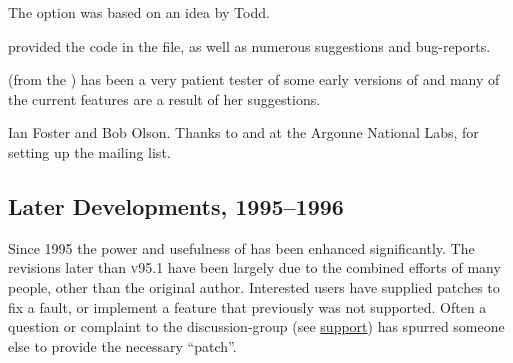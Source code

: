 \begin{htmllist}
\item [\ToddLittle]
The  option was based on an idea by Todd.


\item [\AxelBelinfante]
provided the \Perl{} code in the  file, 
as well as numerous suggestions and bug-reports. 

\item [\VerenaUmar] (from the \CSEP) 
has been a very patient tester of some early versions of \latextohtml{}
and many of the current features are a result of her suggestions. 

%

\item [Ian Foster and Bob Olson.]
Thanks to \IanFoster{} and \BobOlson{} at the Argonne National Labs, 
for setting up the mailing list.
\end{htmllist}


\subsection*{Later Developments, 1995--1996\label{recent96}}%
%
Since 1995 the power and usefulness of \latextohtml{} has been enhanced significantly.
The revisions later than \textsc{v95.1} have been largely due 
to the combined efforts of many people, other than the original author.
Interested users have supplied patches to fix a fault, 
or implement a feature that previously was not supported. 
Often a question or complaint to the discussion-group 
(see \hyperref{Getting Support ...}{Section~}{}{support})
has spurred someone else to provide the necessary ``patch''.%

